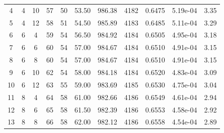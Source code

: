 {\begin{longtable}{|c|c|c|c|c|c|c|c|c|c|c|}
            4            & 4              & 10             & 57                  & 50                   & 53.50                & 986.38            & 4182               & 0.6475               & 5.19e-04         & 3.35            \\
            5            & 4              & 12             & 58                  & 51                   & 54.50                & 985.89            & 4183               & 0.6485               & 5.11e-04         & 3.29            \\ \hline
            6            & 6              & 4              & 59                  & 54                   & 56.50                & 984.92            & 4184               & 0.6505               & 4.95e-04         & 3.18            \\
            7            & 6              & 6              & 60                  & 54                   & 57.00                & 984.67            & 4184               & 0.6510               & 4.91e-04         & 3.15            \\
            8            & 6              & 8              & 60                  & 54                   & 57.00                & 984.67            & 4184               & 0.6510               & 4.91e-04         & 3.15            \\
            9            & 6              & 10             & 62                  & 54                   & 58.00                & 984.18            & 4184               & 0.6520               & 4.83e-04         & 3.09            \\
            10           & 6              & 12             & 63                  & 55                   & 59.00                & 983.69            & 4185               & 0.6530               & 4.75e-04         & 3.04            \\ \hline
            11           & 8              & 4              & 64                  & 58                   & 61.00                & 982.66            & 4186               & 0.6549               & 4.61e-04         & 2.94            \\
            12           & 8              & 6              & 65                  & 58                   & 61.50                & 982.39            & 4186               & 0.6553               & 4.58e-04         & 2.92            \\
            13           & 8              & 8              & 66                  & 58                   & 62.00                & 982.12            & 4186               & 0.6558               & 4.54e-04         & 2.89            \\

\end{longtable}}
